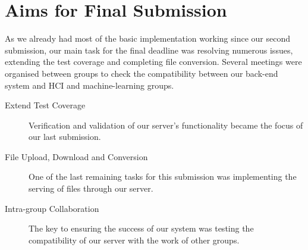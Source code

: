\section{Aims for Final Submission}
As we already had most of the basic implementation working since our second submission, our main task for the final deadline was resolving numerous issues, extending the test coverage and completing file conversion. Several meetings were organised between groups to check the compatibility between our back-end system and HCI and machine-learning groups.
\begin{description}
  \item[Extend Test Coverage] Verification and validation of our server's functionality became the focus of our last submission.
  \item[File Upload, Download and Conversion] One of the last remaining tasks for this submission was implementing the serving of files through our server.
  \item[Intra-group Collaboration] The key to ensuring the success of our system was testing the compatibility of our server with the work of other groups.
\end{description}
